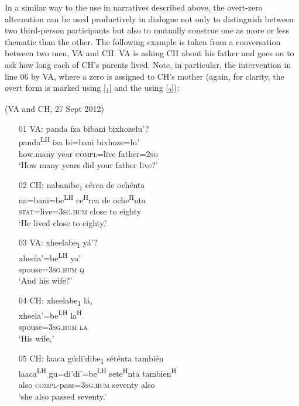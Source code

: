 In a similar way to the use in narratives described above, the overt-zero alternation can be used productively in dialogue not only to distinguish between two third-person participants but also to mutually construe one as more or less thematic than the other. The following example is taken from a conversation between two men, VA and CH. VA is asking CH about his father and goes on to ask how long each of CH's parents lived. Note, in particular, the intervention in line 06 by VA, where a zero  is assigned to CH's mother (again, for clarity, the overt form is marked using [\textsubscript{1}] and the  using [\textsubscript{2}]):

\ea (VA and CH, 27 Sept 2012)
\begin{itemize}
\item[01 VA:]
\glll panda \'{i}za bibani bixhozelu'? \\               
panda\textsuperscript{LH} iza bi=bani bixhoze=lu' \\
how.many year \textsc{compl}=live father=\textsc{2sg} \\
\glt `How many years did your father live?'
 

\item[02 CH:]
\glll nabanibe\textsubscript{1} c\'{e}rca de och\'{e}nta \\   
na=bani=be\textsuperscript{LH} ce\textsuperscript{H}rca de oche\textsuperscript{H}nta \\
\textsc{stat}=live=\textsc{3sg.hum} close to eighty \\
\glt `He lived close to eighty.'


\item[03 VA:]
\glll xheelabe\textsubscript{1} y\'{a}'? \\
xheela'=be\textsuperscript{LH} ya' \\
spouse=\textsc{3sg.hum} \textsc{q} \\
\glt `And his wife?'


\item[04 CH:]
\glll xheelabe\textsubscript{1} l\'{a}, \\
xheela'=be\textsuperscript{LH} la\textsuperscript{H} \\
spouse=\textsc{3sg.hum} \textsc{la}	\\
\glt `His wife,'


\item[05 CH:]
\glll laaca g\'{u}di'dibe\textsubscript{1} s\'{e}t\'{e}nta tambi\'{e}n \\
laaca\textsuperscript{LH} gu=di'di'=be\textsuperscript{LH} sete\textsuperscript{H}nta tambien\textsuperscript{H}  \\
also	\textsc{compl}-pass=\textsc{3sg}.\textsc{hum} seventy also \\
\glt `she also passed seventy.'



\end{itemize}
